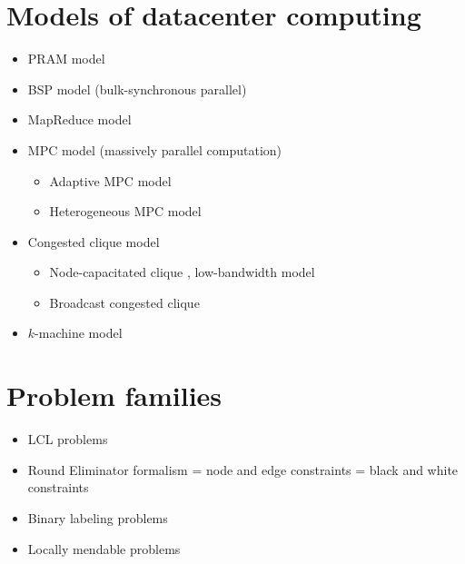 \documentclass[a4paper,11pt]{article}
\begin{document}
\section{Models of datacenter computing}
\begin{itemize}
    \item PRAM model \cite{fortune-wyllie-1978-parallelism-in-random-access}
    \item BSP model (bulk-synchronous parallel) \cite{valiant-1990-a-bridging-model-for-parallel-computation}
    \item MapReduce model \cite{dean-ghemawat-2008-mapreduce-simplified-data-processing}
    \item MPC model (massively parallel computation) \cite{karloff-suri-vassilvitskii-2010-a-model-of-computation,goodrich-sitchinava-zhang-2011-sorting-searching-and,beame-koutris-suciu-2013-communication-steps-for,andoni-nikolov-etal-2014-parallel-algorithms-for}
    \begin{itemize}
        \item Adaptive MPC model \cite{behnezhad-dhulipala-etal-2019-massively-parallel}
        \item Heterogeneous MPC model \cite{fischer-horowitz-oshman-2022-massively-parallel}
    \end{itemize}
    \item Congested clique model \cite{lotker-pavlov-etal-2003-mst-construction-in-o-log-log-n}
    \begin{itemize}
        \item Node-capacitated clique \cite{augustine-ghaffari-etal-2019-distributed-computation-in}, low-bandwidth model \cite{gupta-hirvonen-etal-2022-sparse-matrix-multiplication}
        \item Broadcast congested clique \cite{becker-fernandez-anta-etal-2015-brief-announcement-a}
    \end{itemize}
    \item $k$-machine model \cite{klauck-nanongkai-etal-2015-distributed-computation-of}
\end{itemize}


\section{Problem families}
\begin{itemize}
    \item LCL problems \cite{naor-stockmeyer-1995-what-can-be-computed-locally}
    \item Round Eliminator formalism = node and edge constraints = black and white constraints \cite{olivetti-2020-brief-announcement-round-eliminator-a,olivetti-2025-round-eliminator-a-tool-for-automatic}
    \item Binary labeling problems \cite{balliu-brandt-etal-2020-classification-of-distributed}
    \item Locally mendable problems \cite{balliu-hirvonen-etal-2022-local-mending}
\end{itemize}
\end{document}
